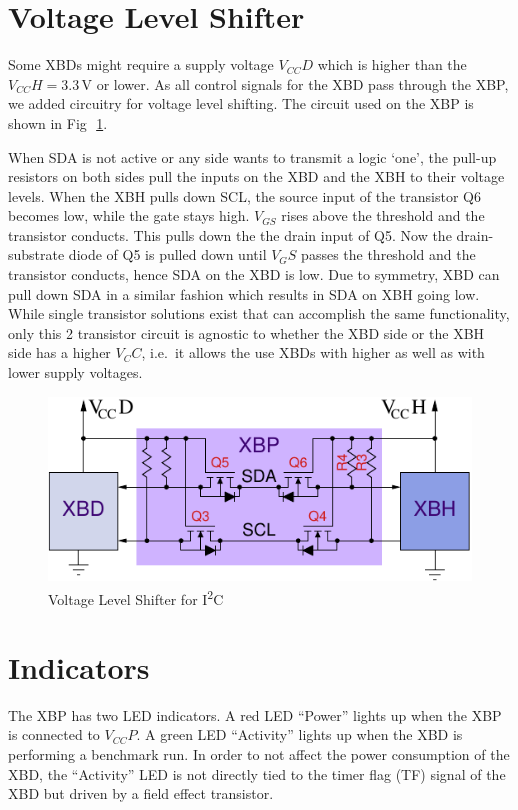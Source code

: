 \documentclass[twoside,11pt]{cergdoc}
\newcommand{\ITwoC}{I\textsuperscript{2}C }
\begin{document}
\section{Voltage Level Shifter}\label{sec:shifter}
Some XBDs might require a supply voltage $V_{CC}D$ which is higher than the $V_{CC}H = 3.3$\,V
or lower. As all control signals for the XBD pass through the XBP, we added circuitry for
voltage level shifting. The circuit used on the XBP is shown in Fig\,~\ref{fig:voltagelevel}. 

When SDA is not active or any side wants to transmit a logic `one', the pull-up resistors on both 
sides pull the inputs on the XBD and the XBH to their voltage levels. 
When the XBH pulls down SCL, the source input of the transistor Q6 becomes low, while the gate stays high. 
$V_{GS}$ rises above the threshold and the transistor conducts. This pulls down the 
the drain input of Q5. Now the drain-substrate diode of Q5 is pulled down until $V_GS$ passes the
threshold and the transistor conducts, hence
SDA on the XBD is low. 
Due to symmetry, XBD can pull down SDA in a similar fashion which results in SDA on XBH going low.
While single transistor solutions exist that can accomplish the same functionality,
only this 2 transistor circuit is agnostic to whether the XBD side or the XBH side has a higher
$V_CC$, i.e.\ it allows the use XBDs with higher as well as with lower supply
voltages. 

\begin{figure}[ht]
  \begin{center}
    \includegraphics[scale=1]{figures/voltagelevel}
    \caption{Voltage Level Shifter for \ITwoC}\label{fig:voltagelevel}
  \end{center}
\end{figure}

\section{Indicators}
The XBP has two LED indicators. A red LED ``Power'' lights up when the XBP is connected to $V_{CC}P$.
A green LED ``Activity'' lights up when the XBD is performing a benchmark run.
In order to not affect the power consumption of the XBD, the ``Activity'' LED is not directly 
tied to the timer flag (TF) signal of the XBD but driven by a field effect transistor.
\end{document}
